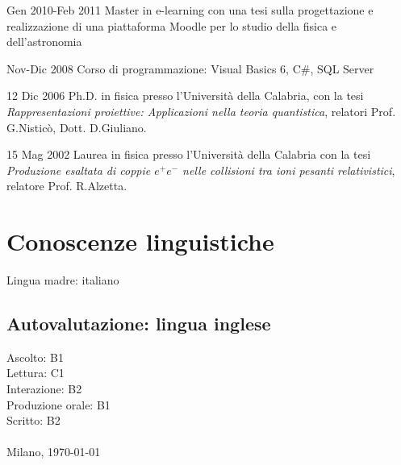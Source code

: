 \begin{CV}
	\item[Gen 2010-Feb 2011] Master in e-learning con una tesi sulla progettazione e realizzazione di una piattaforma Moodle per lo studio della fisica e dell'astronomia
	
	\item[Nov-Dic 2008] Corso di programmazione: Visual Basics 6, C\#, SQL Server
	
	\item[12 Dic 2006] Ph.D. in fisica presso l'Università della Calabria, con la tesi {\em Rappresentazioni proiettive: Applicazioni nella teoria quantistica}, relatori Prof. G.Nisticò, Dott. D.Giuliano.
	
	\item[15 Mag 2002] Laurea in fisica presso l'Università della Calabria con la tesi {\em Produzione esaltata di coppie $e^+ e^-$ nelle collisioni tra ioni pesanti relativistici}, relatore Prof. R.Alzetta.
\end{CV}
%
\newpage
%
\section{Conoscenze linguistiche}
Lingua madre: italiano
\subsection*{Autovalutazione: lingua inglese}
Ascolto: B1\\
Lettura: C1\\
Interazione: B2\\
Produzione orale: B1\\
Scritto: B2\\\\
%
\vspace{2\baselineskip}
\noindent Milano, \today